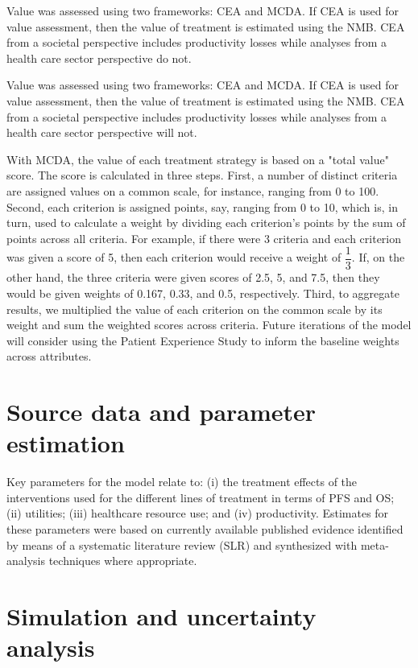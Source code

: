\documentclass[11pt,final,fleqn]{article}\usepackage[]{graphicx}\usepackage[]{color}
\theoremstyle{plain}
\begin{document}
{Value was assessed using two frameworks: CEA and MCDA. If CEA is used for value assessment, then the value of treatment is estimated using the NMB. CEA from a societal perspective includes productivity losses while analyses from a health care sector perspective do not.

Value was assessed using two frameworks: CEA and MCDA. If CEA is used for value assessment, then the value of treatment is estimated using the NMB. CEA from a societal perspective includes productivity losses while analyses from a health care sector perspective will not. 

With MCDA, the value of each treatment strategy is based on a "total value" score. The score is calculated in three steps. First, a number of distinct criteria are assigned values on a common scale, for instance, ranging from 0 to 100. Second, each criterion is assigned points, say, ranging from 0 to 10, which is, in turn, used to calculate a weight by dividing each criterion's points by the sum of points across all criteria. For example, if there were 3 criteria and each criterion was given a score of 5, then each criterion would receive a weight of $ \dfrac{1}{3} $. If, on the other hand, the three criteria were given scores of 2.5, 5, and 7.5, then they would be given weights of 0.167, 0.33, and 0.5, respectively. Third, to aggregate results, we multiplied the value of each criterion on the common scale by its weight and sum the weighted scores across criteria. Future iterations of the model will consider using the Patient Experience Study to inform the baseline weights across attributes. 

\section{Source data and parameter estimation}\label{sec:source-data}

Key parameters for the model relate to: (i) the treatment effects of the interventions used for the different lines of treatment in terms of PFS and OS; (ii) utilities; (iii) healthcare resource use; and (iv) productivity.  Estimates for these parameters were based on currently available published evidence identified by means of a systematic literature review (SLR) and synthesized with meta-analysis techniques where appropriate.

\section{Simulation and uncertainty analysis}\label{sec:uncertainty-analysis}

}
\end{document}
